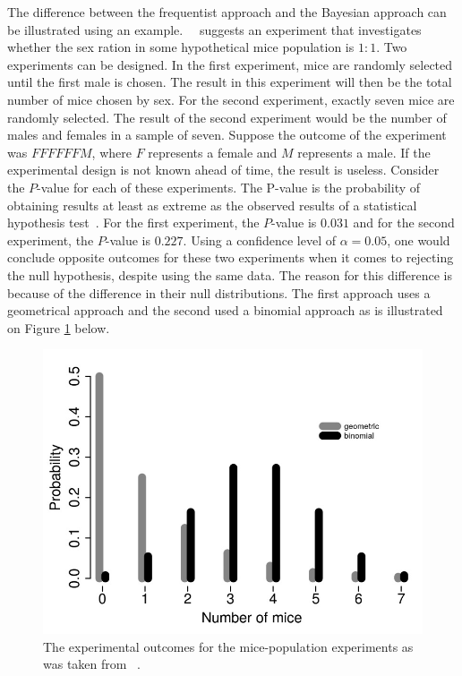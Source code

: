 The difference between the frequentist approach and the Bayesian approach can be illustrated using an example.~\citeauthor{ref:hackenberger:2019}~\cite{ref:hackenberger:2019} suggests an experiment that investigates whether the sex ration in some hypothetical mice population is $1:1$. Two experiments can be designed. In the first experiment, mice are randomly selected until the first male is chosen. The result in this experiment will then be the total number of mice chosen by sex. For the second experiment, exactly seven mice are randomly selected. The result of the second experiment would be the number of males and females in a sample of seven. Suppose the outcome of the experiment was $FFFFFFM$, where $F$ represents a female and $M$ represents a male. If the experimental design is not known ahead of time, the result is useless. Consider the $P$-value for each of these experiments. The P-value is the probability of obtaining results at least as extreme as the observed results of a statistical hypothesis test~\cite{ref:beers:2022}. For the first experiment, the $P$-value is $0.031$ and for the second experiment, the $P$-value is $0.227$. Using a confidence level of $\alpha = 0.05$, one would conclude opposite outcomes for these two experiments when it comes to rejecting the null hypothesis, despite using the same data. The reason for this difference is because of the difference in their null distributions. The first approach uses a geometrical approach and the second used a binomial approach as is illustrated on Figure \ref{fig:probability:bayesian_statistics:mouse_experiment_outcome} below.


\begin{figure}[htbp]
      \includegraphics[width=\textwidth]{images/mouse_experiment_outcome.jpg}
      \caption{The experimental outcomes for the mice-population experiments as was taken from~\cite{ref:hackenberger:2019} .}
      \label{fig:probability:bayesian_statistics:mouse_experiment_outcome}
\end{figure}

